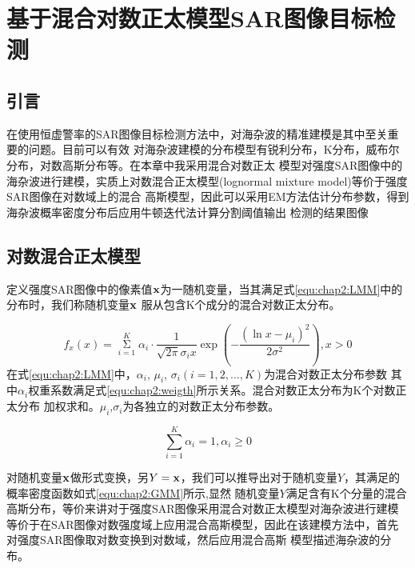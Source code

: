 \chapter{基于混合对数正太模型SAR图像目标检测}
\label{cha:china}

\section{引言}
\label{sec:chap2:sec1}
在使用恒虚警率的SAR图像目标检测方法中，对海杂波的精准建模是其中至关重要的问题。目前可以有效
对海杂波建模的分布模型有锐利分布，K分布，威布尔分布，对数高斯分布等。在本章中我采用混合对数正太
模型对强度SAR图像中的海杂波进行建模，实质上对数混合正太模型(lognormal mixture model)等价于强度SAR图像在对数域上的混合
高斯模型，因此可以采用EM方法估计分布参数，得到海杂波概率密度分布后应用牛顿迭代法计算分割阈值输出
检测的结果图像


\section{对数混合正太模型}
\label{sec:chap2:sec2}
  定义强度SAR图像中的像素值$\bf{x}$为一随机变量，当其满足式\ref{equ:chap2:LMM}中的分布时，我们称随机变量$\bf{x}$
  服从包含K个成分的混合对数正太分布。

    \begin{equation}
      \label{equ:chap2:LMM}
      {f_x}(x) = \mathop \Sigma \limits_{i = 1}^K {\alpha _i} \cdot \frac{1}{{\sqrt {2\pi } {\sigma _i}x}}\exp ( - \frac{{{{(\ln x - {\mu _i})}^2}}}{{2{\sigma ^2}}}),x > 0
    \end{equation}
  在式\ref{equ:chap2:LMM}中，$\alpha_i$, $\mu_i$, $\sigma_i(i=1,2,...,K)$为混合对数正太分布参数
  其中$\alpha_i$权重系数满足式\ref{equ:chap2:weigth}所示关系。混合对数正太分布为K个对数正太分布
  加权求和。$\mu_i$,$\sigma_i$为各独立的对数正太分布参数。

    \begin{equation}
      \label{equ:chap2:weigth}
      \sum\limits_{i = 1}^K {{\alpha _i} = 1,{\alpha _i} \ge 0} 
    \end{equation}

  对随机变量$\bf{x}$做形式变换，另$Y=\bf{x}$，我们可以推导出对于随机变量$Y$，其满足的概率密度函数如式\ref{equ:chap2:GMM}所示,显然
  随机变量$Y$满足含有K个分量的混合高斯分布，等价来讲对于强度SAR图像采用混合对数正太模型对海杂波进行建模
  等价于在SAR图像对数强度域上应用混合高斯模型，因此在该建模方法中，首先对强度SAR图像取对数变换到对数域，然后应用混合高斯
  模型描述海杂波的分布。

